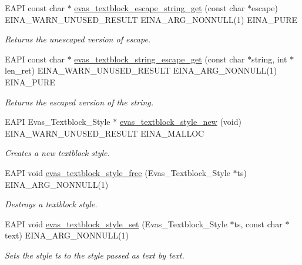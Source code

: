 \begin{DoxyCompactItemize}
EAPI const char $\ast$ \hyperlink{group__Evas__Object__Textblock_gac165d57003e552fa6739158dc2ed73f5}{evas\_\-textblock\_\-escape\_\-string\_\-get} (const char $\ast$escape) EINA\_\-WARN\_\-UNUSED\_\-RESULT EINA\_\-ARG\_\-NONNULL(1) EINA\_\-PURE
\begin{DoxyCompactList}\small\item\em Returns the unescaped version of escape. \item\end{DoxyCompactList}\item 
EAPI const char $\ast$ \hyperlink{group__Evas__Object__Textblock_ga70b3680a8691c70bab39bd1c127424a5}{evas\_\-textblock\_\-string\_\-escape\_\-get} (const char $\ast$string, int $\ast$len\_\-ret) EINA\_\-WARN\_\-UNUSED\_\-RESULT EINA\_\-ARG\_\-NONNULL(1) EINA\_\-PURE
\begin{DoxyCompactList}\small\item\em Returns the escaped version of the string. \item\end{DoxyCompactList}\item 
EAPI Evas\_\-Textblock\_\-Style $\ast$ \hyperlink{group__Evas__Object__Textblock_ga00cc8baec308c583ac801811dd381d4c}{evas\_\-textblock\_\-style\_\-new} (void) EINA\_\-WARN\_\-UNUSED\_\-RESULT EINA\_\-MALLOC
\begin{DoxyCompactList}\small\item\em Creates a new textblock style. \item\end{DoxyCompactList}\item 
EAPI void \hyperlink{group__Evas__Object__Textblock_gaf527de9ea652e4435a0eaa6cda09585f}{evas\_\-textblock\_\-style\_\-free} (Evas\_\-Textblock\_\-Style $\ast$ts) EINA\_\-ARG\_\-NONNULL(1)
\begin{DoxyCompactList}\small\item\em Destroys a textblock style. \item\end{DoxyCompactList}\item 
EAPI void \hyperlink{group__Evas__Object__Textblock_gac239e4649b0893284ea962a2183c3f14}{evas\_\-textblock\_\-style\_\-set} (Evas\_\-Textblock\_\-Style $\ast$ts, const char $\ast$text) EINA\_\-ARG\_\-NONNULL(1)
\begin{DoxyCompactList}\small\item\em Sets the style ts to the style passed as text by text. \item\end{DoxyCompactList}\item 

\end{DoxyCompactItemize}
